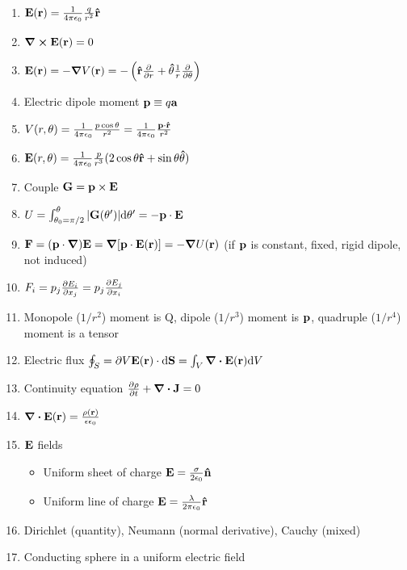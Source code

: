 \documentclass{article}
\theoremstyle{remark}
\theoremstyle{remark}
\begin{document}
\begin{enumerate}
    \item $\vb{E}(\vb{r}) = \frac{1}{4\pi\epsilon_0}\frac{q}{r^2}\vb{\hat{r}} $
    \item $\curl\vb{E}(\vb{r}) = 0 $
    \item $\vb{E}(\vb{r}) = -\grad V(\vb{r}) = -\left(\vb{\hat r}\pdv{r}+\vb{\hat \theta}\frac{1}{r}\pdv{\theta}\right) $
    \item Electric dipole moment $\vb{p}\equiv q\vb{a} $
    \item $V(r,\theta) = \frac{1}{4\pi\epsilon_0}\frac{p\cos\theta}{r^2} = \frac{1}{4\pi\epsilon_0}\frac{\vb{p}\cdot\vb{\hat r}}{r^2} $
    \item $\vb{E}(r,\theta) = \frac{1}{4\pi\epsilon_0}\frac{p}{r^3}(2\cos\theta\vb{\hat r} + \sin\theta\vb{\hat\theta}) $
    \item Couple $\vb{G} = \vb{p}\times\vb{E} $
    \item $U = \int_{\theta_0=\pi/2}^{\theta} |\vb{G}(\theta')|\dd\theta' = -\vb{p}\cdot\vb{E} $
    \item $\vb{F} = (\vb{p}\cdot\grad)\vb{E} = \grad[\vb{p}\cdot\vb{E(\vb{r})}] = -\grad U(\vb{r}) $ (if $\vb{p}$ is constant, fixed, rigid dipole, not induced)
    \item $F_i = p_j\pdv{E_i}{x_j} = p_j\pdv{E_j}{x_i} $
    \item Monopole ($1/r^2$) moment is Q, dipole ($1/r^3$) moment is $\vb{p}$, quadruple ($1/r^4$) moment is a tensor
    \item Electric flux $\oint_S=\partial V \vb{E}(\vb{r})\cdot\dd\vb{S} = \int_V\div\vb{E}(\vb{r})\dd V $
    \item Continuity equation $\pdv{\rho}{t}+\div\vb{J} = 0 $
    \item $\div\vb{E}(\vb{r}) = \frac{\rho(\vb{r})}{\epsilon\epsilon_0} $
    \item $\vb{E}$ fields\begin{itemize}
        \item Uniform sheet of charge $\vb{E} = \frac{\sigma}{2\epsilon_0}\vb{\hat n} $
        \item Uniform line of charge $\vb{E} = \frac{\lambda}{2\pi\epsilon_0}\vb{\hat r} $
    \end{itemize}
    \item Dirichlet (quantity), Neumann (normal derivative), Cauchy (mixed)
    \item Conducting sphere in a uniform electric field\begin{itemize}

\end{itemize}
\end{enumerate}
\end{document}
